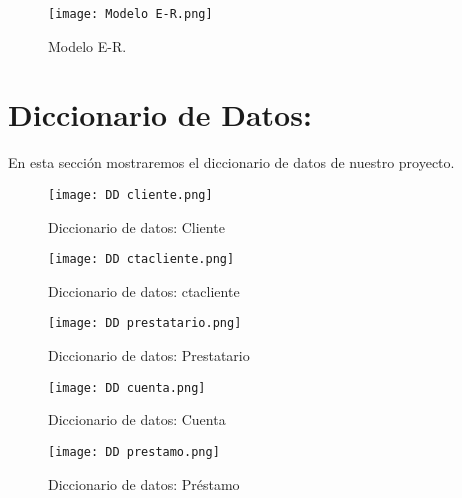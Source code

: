 \documentclass[titlepage, 12pt]{article}
\begin{document}
    \begin{figure}[h]
    \caption{Modelo E-R.}
    \centering
    \texttt{[image: Modelo E-R.png]} \par\vspace{0.5cm}
    \end{figure}

\section{Diccionario de Datos:}

En esta sección mostraremos el diccionario de datos de nuestro proyecto.

    \clearpage

    \begin{figure}[h]
    \caption{Diccionario de datos: Cliente}
    \centering
    \texttt{[image: DD cliente.png]} \par\vspace{0.5cm}
    \end{figure}
    
    \begin{figure}[h]
    \caption{Diccionario de datos: ctacliente}
    \centering
    \texttt{[image: DD ctacliente.png]} \par\vspace{0.5cm}
    \end{figure}
    
    \clearpage
    
    \begin{figure}[h]
    \caption{Diccionario de datos: Prestatario}
    \centering
    \texttt{[image: DD prestatario.png]} \par\vspace{0.5cm}
    \end{figure}
    
    \begin{figure}[h]
    \caption{Diccionario de datos: Cuenta}
    \centering
    \texttt{[image: DD cuenta.png]} \par\vspace{0.5cm}
    \end{figure}
    
    \clearpage
    
    \begin{figure}[h]
    \caption{Diccionario de datos: Préstamo}
    \centering
    \texttt{[image: DD prestamo.png]} \par\vspace{0.5cm}
    \end{figure}
    
\end{document}
